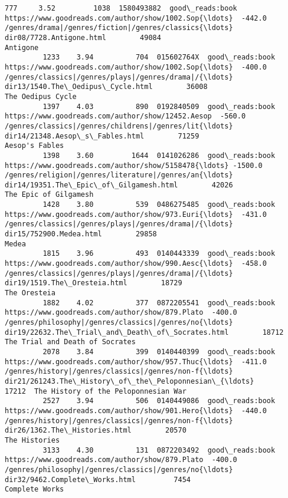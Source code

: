 \documentclass[11pt]{article}
\begin{document}
\begin{Verbatim}[commandchars=\\\{\}]
         777     3.52         1038  1580493882  good\_reads:book  https://www.goodreads.com/author/show/1002.Sop{\ldots}  -442.0  /genres/drama|/genres/fiction|/genres/classics{\ldots}                           dir08/7728.Antigone.html        49084                              Antigone
         1233    3.94          704  015602764X  good\_reads:book  https://www.goodreads.com/author/show/1002.Sop{\ldots}  -400.0  /genres/classics|/genres/plays|/genres/drama|/{\ldots}                  dir13/1540.The\_Oedipus\_Cycle.html        36008                     The Oedipus Cycle
         1397    4.03          890  0192840509  good\_reads:book  https://www.goodreads.com/author/show/12452.Aesop  -560.0  /genres/classics|/genres/childrens|/genres/lit{\ldots}                    dir14/21348.Aesop\_s\_Fables.html        71259                        Aesop's Fables
         1398    3.60         1644  0141026286  good\_reads:book  https://www.goodreads.com/author/show/5158478{\ldots} -1500.0  /genres/religion|/genres/literature|/genres/an{\ldots}             dir14/19351.The\_Epic\_of\_Gilgamesh.html        42026                 The Epic of Gilgamesh
         1428    3.80          539  0486275485  good\_reads:book  https://www.goodreads.com/author/show/973.Euri{\ldots}  -431.0  /genres/classics|/genres/plays|/genres/drama|/{\ldots}                            dir15/752900.Medea.html        29858                                 Medea
         1815    3.96          493  0140443339  good\_reads:book  https://www.goodreads.com/author/show/990.Aesc{\ldots}  -458.0  /genres/classics|/genres/plays|/genres/drama|/{\ldots}                       dir19/1519.The\_Oresteia.html        18729                          The Oresteia
         1882    4.02          377  0872205541  good\_reads:book    https://www.goodreads.com/author/show/879.Plato  -400.0  /genres/philosophy|/genres/classics|/genres/no{\ldots}   dir19/22632.The\_Trial\_and\_Death\_of\_Socrates.html        18712       The Trial and Death of Socrates
         2078    3.84          399  0140440399  good\_reads:book  https://www.goodreads.com/author/show/957.Thuc{\ldots}  -411.0  /genres/history|/genres/classics|/genres/non-f{\ldots}  dir21/261243.The\_History\_of\_the\_Peloponnesian\_{\ldots}        17212  The History of the Peloponnesian War
         2527    3.94          506  0140449086  good\_reads:book  https://www.goodreads.com/author/show/901.Hero{\ldots}  -440.0  /genres/history|/genres/classics|/genres/non-f{\ldots}                      dir26/1362.The\_Histories.html        20570                         The Histories
         3133    4.30          131  0872203492  good\_reads:book    https://www.goodreads.com/author/show/879.Plato  -400.0  /genres/philosophy|/genres/classics|/genres/no{\ldots}                     dir32/9462.Complete\_Works.html         7454                        Complete Works

\end{Verbatim}
\end{document}
